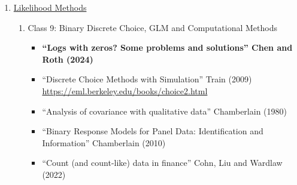 \documentclass[11pt, a4paper]{article}
\begin{document}
\begin{enumerate}
\begin{enumerate}
\begin{itemize}
    \item ``Sparse estimators and the oracle property, or the return of Hodges' estimator'' Leeb and Potscher (2008)
    \item ``Preconditioning the lasso for sign consistency'' Jia and Rohe (2015)
    \item ``Double/debiased/neyman machine learning of treatment effects'' Chernozhukov et al. (2017)
    \item ``Double/debiased machine learning for treatment and structural parameters'' Chernozhukov et al. (2018)
    \item ``Generic machine learning inference on heterogenous treatment effects in randomized experiments'' Chernozhukov et al. (2020)
    \item ``High-Dimensional Methods and Inference on Structural and Treatment Effects'', Belloni, Chernozhukov  and Hansen (2014)
    \item ``Inference on treatment effects after selection among high-dimensional controls'' Belloni, Chernozhukov  and Hansen (2014)
    \item ``On model selection consistency of Lasso'' Zhao and Yu (2006)
    \item  ``Omitted variable bias of Lasso-based inference methods: A finite sample analysis'' Wuthrich and Zhu (2020)
    \item ``Taming the factor zoo: A test of new factors'' Feng, Giglio, and Xiu (2020)
    \end{itemize}
  \end{enumerate}
\item \underline{Likelihood Methods}
  \begin{enumerate}
  \item Class 9: Binary Discrete Choice, GLM and Computational Methods
    \begin{itemize}
      \item \textbf{``Logs with zeros? Some problems and solutions'' Chen and Roth (2024)}
    \item ``Discrete Choice Methods with Simulation'' Train (2009) \url{https://eml.berkeley.edu/books/choice2.html}
    \item ``Analysis of covariance with qualitative data'' Chamberlain (1980)
    \item ``Binary Response Models for Panel Data: Identification and Information'' Chamberlain (2010)
    \item ``Count (and count-like) data in finance'' Cohn, Liu and Wardlaw (2022)
    \end{itemize}

\end{enumerate}
\end{enumerate}
\end{document}
